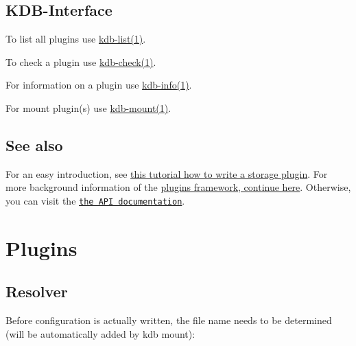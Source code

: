 \subsection*{K\+D\+B-\/\+Interface}


\begin{DoxyItemize}
\item To list all plugins use \hyperlink{md_doc_help_kdb-list_doc_help_kdb-list_md}{kdb-\/list(1)}.
\item To check a plugin use \hyperlink{md_doc_help_kdb-check_doc_help_kdb-check_md}{kdb-\/check(1)}.
\item For information on a plugin use \hyperlink{md_doc_help_kdb-info_doc_help_kdb-info_md}{kdb-\/info(1)}.
\item For mount plugin(s) use \hyperlink{md_doc_help_kdb-mount_doc_help_kdb-mount_md}{kdb-\/mount(1)}.
\end{DoxyItemize}

\subsection*{See also}

For an easy introduction, see \hyperlink{doc_tutorials_plugins_md}{this tutorial how to write a storage plugin}. For more background information of the \hyperlink{md_doc_help_elektra-plugins-framework_doc_help_elektra-plugins-framework_md}{plugins framework, continue here}. Otherwise, you can visit the \href{http://doc.libelektra.org/api/current/html/group__plugin.html}{\tt the A\+P\+I documentation}.

\section*{Plugins}

\subsection*{Resolver}

Before configuration is actually written, the file name needs to be determined (will be automatically added by kdb mount)\+:


